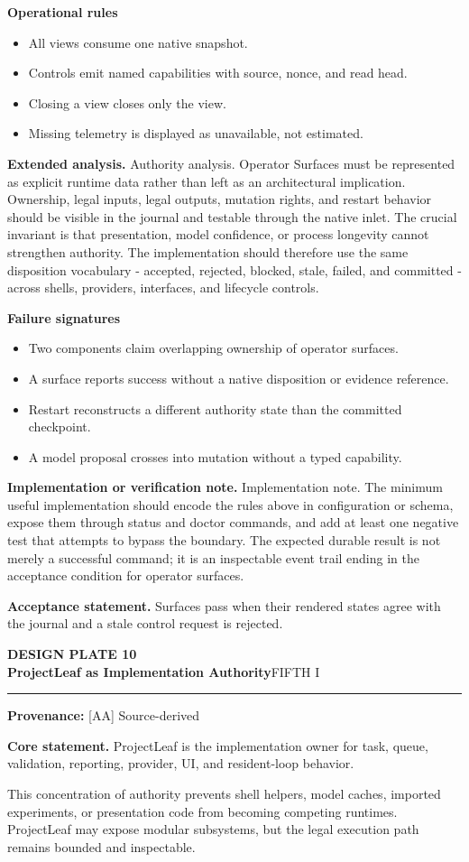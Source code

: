 \documentclass[10pt,letterpaper,oneside]{article}
\newcommand{\prov}[1]{\textcolor{gardenBlue}{\sffamily\footnotesize\textbf{Provenance:} #1}}
\newcommand{\platetitle}[3]{%
  \begin{minipage}[t][0.54in][t]{\textwidth}
  {\sffamily\bfseries\color{gardenDeep}\fontsize{9}{10}\selectfont DESIGN PLATE #1}\\[-1pt]
  {\sffamily\bfseries\color{gardenInk}\fontsize{16.5}{18}\selectfont #2}\hfill{\sffamily\color{gardenGreen}\large #3}
  \end{minipage}\vspace{-2pt}\hrule\vspace{5pt}}
\begin{document}
\textbf{Operational rules}
\begin{itemize}
\item All views consume one native snapshot.
\item Controls emit named capabilities with source, nonce, and read head.
\item Closing a view closes only the view.
\item Missing telemetry is displayed as unavailable, not estimated.
\end{itemize}
\textbf{Extended analysis.} Authority analysis. Operator Surfaces must be represented as explicit runtime data rather than left as an architectural implication. Ownership, legal inputs, legal outputs, mutation rights, and restart behavior should be visible in the journal and testable through the native inlet. The crucial invariant is that presentation, model confidence, or process longevity cannot strengthen authority. The implementation should therefore use the same disposition vocabulary - accepted, rejected, blocked, stale, failed, and committed - across shells, providers, interfaces, and lifecycle controls.

\textbf{Failure signatures}
\begin{itemize}
\item Two components claim overlapping ownership of operator surfaces.
\item A surface reports success without a native disposition or evidence reference.
\item Restart reconstructs a different authority state than the committed checkpoint.
\item A model proposal crosses into mutation without a typed capability.
\end{itemize}
\textbf{Implementation or verification note.} Implementation note. The minimum useful implementation should encode the rules above in configuration or schema, expose them through status and doctor commands, and add at least one negative test that attempts to bypass the boundary. The expected durable result is not merely a successful command; it is an inspectable event trail ending in the acceptance condition for operator surfaces.

\begin{acceptbox}
\textbf{Acceptance statement.} Surfaces pass when their rendered states agree with the journal and a stale control request is rejected.
\end{acceptbox}
\newpage
\platetitle{10}{ProjectLeaf as Implementation Authority}{FIFTH I}
\prov{[AA] Source-derived}
\fontsize{8.85}{10.45}\selectfont
\begin{corebox}
\textbf{Core statement.} ProjectLeaf is the implementation owner for task, queue, validation, reporting, provider, UI, and resident-loop behavior.
\end{corebox}
This concentration of authority prevents shell helpers, model caches, imported experiments, or presentation code from becoming competing runtimes. ProjectLeaf may expose modular subsystems, but the legal execution path remains bounded and inspectable.
\end{document}
